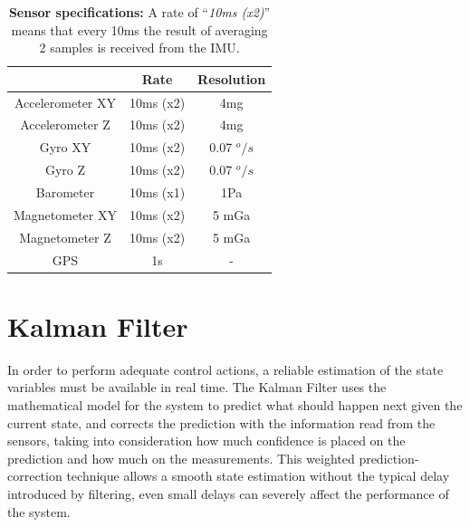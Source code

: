 \documentclass[conference]{IEEEtran}
\begin{document}
\begin{table}[h]
\begin{center}
\begin{tabular}{|c|c|c|}
\hline
 & Rate & Resolution \\
\hline
Accelerometer XY & 10ms (x2)& 4mg\\
\hline
Accelerometer Z  & 10ms (x2)& 4mg\\
\hline
Gyro XY  & 10ms (x2)& 0.07 $^o/s$\\
\hline
Gyro Z  & 10ms (x2)& 0.07 $^o/s$\\
\hline
Barometer  & 10ms (x1) & 1Pa\\
\hline
Magnetometer XY  & 10ms  (x2)& 5 mGa\\
\hline
Magnetometer Z  & 10ms (x2)& 5 mGa\\
\hline
GPS  & 1s & - \\
\hline
\end{tabular}
\end{center}
\caption{\textbf{Sensor specifications:} A rate of ``\textit{10ms (x2)}'' means that every 10ms the result of averaging 2 samples is received from the IMU.}
\label{tab:sensors:resumen}
\end{table}

\section{Kalman Filter}

In order to perform adequate control actions, a reliable estimation of the state variables must be available in real time. The Kalman Filter uses the mathematical model for the system to predict what should happen next given the current state, and corrects the prediction with the information read from the sensors, taking into consideration how much confidence is placed on the prediction and how much on the measurements. This weighted prediction-correction technique allows a smooth state estimation without the typical delay introduced by filtering, even small delays can severely affect the performance of the system.
\end{document}
